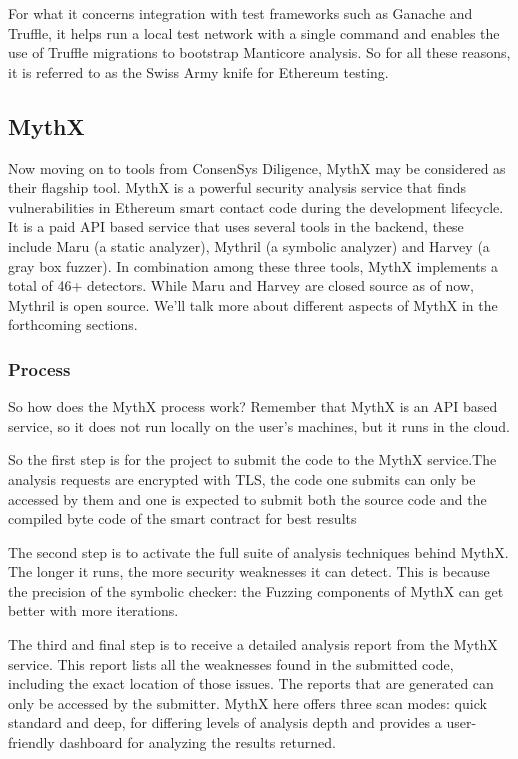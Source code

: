 For what it concerns integration with test frameworks such as Ganache
and Truffle, it helps run a local test network with a single command and
enables the use of Truffle migrations to bootstrap Manticore analysis.
So for all these reasons, it is referred to as the Swiss Army knife for
Ethereum testing.

\subsection{MythX}\label{mythx}

Now moving on to tools from ConsenSys Diligence, MythX may be considered
as their flagship tool. MythX is a powerful security analysis service
that finds vulnerabilities in Ethereum smart contact code during the
development lifecycle. It is a paid API based service that uses several
tools in the backend, these include Maru (a static analyzer), Mythril (a
symbolic analyzer) and Harvey (a gray box fuzzer). In combination among
these three tools, MythX implements a total of 46+ detectors. While Maru
and Harvey are closed source as of now, Mythril is open source. We'll
talk more about different aspects of MythX in the forthcoming sections.

\subsubsection{Process}\label{process}

So how does the MythX process work? Remember that MythX is an API based
service, so it does not run locally on the user's machines, but it runs
in the cloud.

So the first step is for the project to submit the code to the MythX
service.The analysis requests are encrypted with TLS, the code one
submits can only be accessed by them and one is expected to submit both
the source code and the compiled byte code of the smart contract for
best results

The second step is to activate the full suite of analysis techniques
behind MythX. The longer it runs, the more security weaknesses it can
detect. This is because the precision of the symbolic checker: the
Fuzzing components of MythX can get better with more iterations.

The third and final step is to receive a detailed analysis report from
the MythX service. This report lists all the weaknesses found in the
submitted code, including the exact location of those issues. The
reports that are generated can only be accessed by the submitter. MythX
here offers three scan modes: quick standard and deep, for differing
levels of analysis depth and provides a user-friendly dashboard for
analyzing the results returned.

